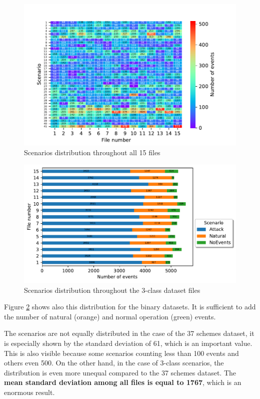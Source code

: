 \begin{figure}[H]
    \centering
    \includegraphics[]{images/distr_allscen.pdf}
    \caption{Scenarios distribution throughout all 15 files} \label{fig:scen_distro_37}
\end{figure}   

\begin{figure}[H] 
    \centering
    \includegraphics[]{images/distr_3classes.pdf}
    \caption{Scenarios distribution throughout the 3-class dataset files}
    \label{fig:scen_distro_file}
\end{figure}

Figure \ref{fig:scen_distro_file} shows also this distribution for the binary datasets. It is sufficient to add the number of natural (orange) and normal operation (green) events.

The scenarios are not equally distributed in the case of the 37 schemes dataset, it is especially shown by the standard deviation of 61, which is an important value. This is also visible because some scenarios counting less than 100 events and others even 500. On the other hand, in the case of 3-class scenarios, the distribution is even more unequal compared to the 37 schemes dataset. The \textbf{mean standard deviation among all files is equal to 1767}, which is an enormous result.

